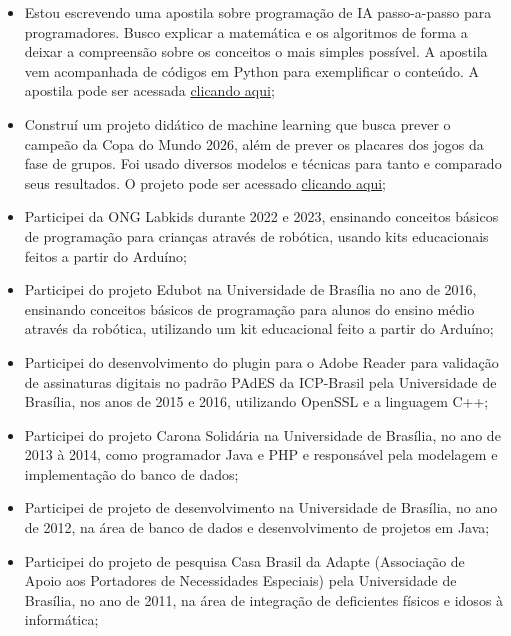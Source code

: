 \begin{itemize}
    \item Estou escrevendo uma apostila sobre programação de IA passo-a-passo para programadores. Busco explicar a matemática e os algoritmos de forma a deixar a compreensão sobre os conceitos o mais simples possível. A apostila vem acompanhada de códigos em Python para exemplificar o conteúdo. A apostila pode ser acessada \href{https://github.com/rodrigorincon/ia}{clicando aqui};
    \item Construí um projeto didático de machine learning que busca prever o campeão da Copa do Mundo 2026, além de prever os placares dos jogos da fase de grupos. Foi usado diversos modelos e técnicas para tanto e comparado seus resultados. O projeto pode ser acessado \href{https://github.com/rodrigorincon/previsor-copa-do-mundo}{clicando aqui};
    \item Participei da ONG Labkids durante 2022 e 2023, ensinando conceitos básicos de programação para crianças através de robótica, usando kits educacionais feitos a partir do Arduíno;
    \item Participei do projeto Edubot na Universidade de Brasília no ano de 2016, ensinando conceitos básicos de programação para alunos do ensino médio através da robótica, utilizando um kit educacional feito a partir do Arduíno;
    \item Participei do desenvolvimento do plugin para o Adobe Reader para validação de assinaturas digitais no padrão PAdES da ICP-Brasil pela Universidade de Brasília, nos anos de 2015 e 2016, utilizando OpenSSL e a linguagem C++;
    \item Participei do projeto Carona Solidária na Universidade de Brasília, no ano de 2013 à 2014, como programador Java e PHP e responsável pela modelagem e implementação do banco de dados;
    \item Participei de projeto de desenvolvimento na Universidade de Brasília, no ano de 2012, na área de banco de dados e desenvolvimento de projetos em Java;
    \item Participei do projeto de pesquisa Casa Brasil da Adapte (Associação de Apoio aos Portadores de Necessidades Especiais) pela Universidade de Brasília, no ano de 2011, na área de integração de deficientes físicos e idosos à informática;
\end{itemize}
